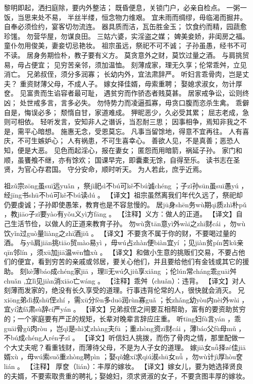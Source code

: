 \documentclass[12pt,UTF8]{ctexbook}
\begin{document}
黎明即起，洒扫庭除，要内外整洁；
既昏便息，关锁门户，必亲自检点。
一粥一饭，当思来处不易，
半丝半缕，恒念物力维艰。
宜未雨而绸缪，毋临渴而掘井。
自奉必须俭约，宴客切勿流连。
器具质而洁，瓦缶胜金玉；
饮食约而精，园蔬愈珍馐。
勿营华屋，勿谋良田。
三姑六婆，实淫盗之媒；
婢美妾娇，非闺房之福。
童仆勿用俊美，妻妾切忌艳妆。
祖宗虽远，祭祀不可不诚；
子孙虽愚，经书不可不读。
居身务期俭朴，教子要有义方。
莫贪意外之财，莫饮过量之酒。
与肩挑贸易，毋占便宜；
见穷苦亲邻，须加温恤。
刻薄成家，理无久享；伦常乖舛，立见消亡。
兄弟叔侄，须分多润寡；
长幼内外，宜法肃辞严。
听妇言乖骨肉，岂是丈夫？
重资财薄父母，不成人子。
嫁女择佳婿，毋索重聘；
娶媳求淑女，勿计厚奁。
见富贵而生谄容者最可耻，
遇贫穷而作骄态者贱莫甚。
居家戒争讼，讼则终凶；
处世戒多言，言多必失。
勿恃势力而凌逼孤寡，毋贪口腹而恣杀生禽。
乖僻自是，悔误必多；
颓惰自甘，家道难成。
狎昵恶少，久必受其累；
屈志老成，急则可相依。
轻听发言，安知非人之谮诉，当忍耐三思；
因事相争，焉知非我之不是，需平心暗想。
施惠无念，受恩莫忘。
凡事当留馀地，得意不宜再往。
人有喜庆，不可生嫉妒心；
人有祸患，不可生喜幸心。
善欲人见，不是真善；恶恐人知，便是大恶。
见色而起淫心，报在妻女；
匿怨而用暗箭，祸延子孙。
家门和顺，虽饔飧不继，亦有馀欢；
国课早完，即囊橐无馀，自得至乐。
读书志在圣贤，为官心存君国。
守分安命，顺时听天。
为人若此，庶乎近焉。

祖zǔ宗zōng虽suī远yuǎn
，祭jì祀sì不bú可kě不bú诚chéng
；子zǐ孙sūn虽suī愚yú
，经jīng书shū不bú可kě不bú读dú
。
【译文】祖宗虽然离我们年代久远了，祭祀却仍要虔诚；子孙即使愚笨，教育也是不容怠慢的。
居jū身shēn务wù期qī质zhì朴pǔ
，教jiāo子zǐ要yào有yǒu义yì方fāng
。
【注释】义方：做人的正道。
【译文】自己生活节俭，以做人的正道来教育子孙。
勿wù贪tān意yì外wài之zhī财cái
，勿wù饮yǐn过guò量liàng之zhī酒jiǔ
。
【译文】不要贪不属于你的财，不要喝过量的酒。
与yǔ肩jiān挑tiāo贸mào易yì
，毋wú占zhàn便biàn宜yí
；见jiàn贫pín苦kǔ亲qīn邻lín
，须xū加jiā温wēn恤xù
。
【译文】和做小生意的挑贩们交易，不要占他们的便宜，看到穷苦的亲戚或邻居，要关心他们，并且要给他们有金钱或其它的援助。
刻kè薄báo成chéng家jiā
，理lǐ无wú久jiǔ享xiǎng
；伦lún常cháng乖guāi舛chuǎn
,立lì见jiàn消xiāo亡wáng
。
【注释】乖舛（chuǎn）：违背。
【译文】对人刻薄而发家的，绝没有长久享受的道理。行事违背伦常的人，很快就会消灭。
兄xiōng弟dì叔shū侄zhí
，需xū分fèn多duō润rùn寡guǎ
；长zhǎng幼yòu内nèi外wài
，宜yí法fǎ肃sù辞cí严yán
。
【译文】兄弟叔侄之间要互相帮助，富有的要资助贫穷的；一个家庭要有严正的规矩，长辈对晚辈言辞应庄重。
听tīng妇fù言yán
，乖guāi骨gǔ肉ròu
，岂qǐ是shì丈zhàng夫fū
；重zhòng资zī财cái
，薄báo父fù母mǔ
，不bú成chéng人rén子zǐ
。
【译文】听信妇人挑拨，而伤了骨肉之情，那里配做一个大丈夫呢？看重钱财，而薄待父母，不是为人子女的道理。
嫁jià女nǚ择zé佳jiā婿xù
，毋wú索suǒ重zhòng聘pìn
；娶qǔ媳xí求qiú淑shū女nǚ
，勿wù计jì厚hòu奁lián
。
【注释】 厚奁（lián）：丰厚的嫁妆。
【译文】嫁女儿，要为她选择贤良的夫婿，不要索取贵重的聘礼；娶媳妇，须求贤淑的女子，不要贪图丰厚的嫁妆。
\end{document}
